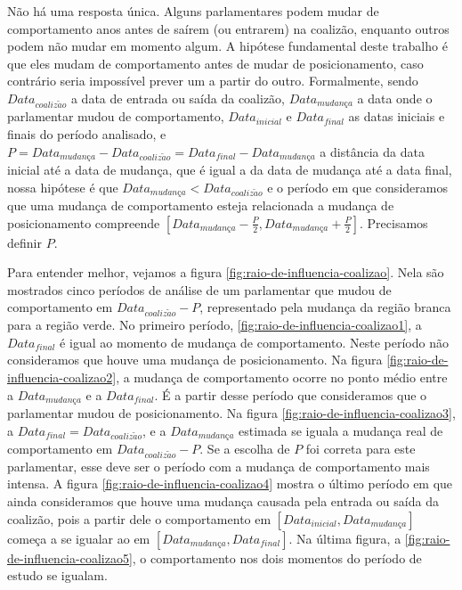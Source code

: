 \documentclass[a4paper,titlepage]{ppgi}\usepackage[]{graphicx}\usepackage[]{color}
\begin{document}
Não há uma resposta única. Alguns parlamentares podem mudar de comportamento
anos antes de saírem (ou entrarem) na coalizão, enquanto outros podem não mudar
em momento algum. A hipótese fundamental deste trabalho é que eles mudam de
comportamento antes de mudar de posicionamento, caso contrário seria impossível
prever um a partir do outro. Formalmente, sendo $Data_{coaliz\tilde{a}o}$ a
data de entrada ou saída da coalizão, $Data_{mudan\textit{\c{c}}a}$ a data onde
o parlamentar mudou de comportamento, $Data_{inicial}$ e $Data_{final}$ as datas
iniciais e finais do período analisado, e $P = Data_{mudan\textit{\c{c}}a} -
Data_{coaliz\tilde{a}o} = Data_{final} - Data_{mudan\textit{\c{c}}a}$ a
distância da data inicial até a data de mudança, que é igual a da data de
mudança até a data final, nossa hipótese é que $Data_{mudan\textit{\c{c}}a} <
Data_{coaliz\tilde{a}o}$ e o período em que consideramos que uma mudança de
comportamento esteja relacionada a mudança de posicionamento compreende
$\left[Data_{mudan\textit{\c{c}}a} - \frac{P}{2}, Data_{mudan\textit{\c{c}}a} +
\frac{P}{2}\right]$. Precisamos definir $P$.

Para entender melhor, vejamos a figura \ref{fig:raio-de-influencia-coalizao}.
Nela são mostrados cinco períodos de análise de um parlamentar que mudou de
comportamento em $Data_{coaliz\tilde{a}o} - P$, representado pela mudança da
região branca para a região verde. No primeiro período,
\ref{fig:raio-de-influencia-coalizao1}, a $Data_{final}$ é igual ao momento de
mudança de comportamento. Neste período não consideramos que houve uma mudança
de posicionamento. Na figura \ref{fig:raio-de-influencia-coalizao2}, a mudança
de comportamento ocorre no ponto médio entre a $Data_{mudan\textit{\c{c}}a}$ e
a $Data_{final}$.  É a partir desse período que consideramos que o parlamentar
mudou de posicionamento. Na figura \ref{fig:raio-de-influencia-coalizao3}, a
$Data_{final} = Data_{coaliz\tilde{a}o}$, e a $Data_{mudan\textit{\c{c}}a}$
estimada se iguala a mudança real de comportamento em $Data_{coaliz\tilde{a}o}
- P$. Se a escolha de $P$ foi correta para este parlamentar, esse deve ser o
período com a mudança de comportamento mais intensa. A figura
\ref{fig:raio-de-influencia-coalizao4} mostra o último período em que ainda
consideramos que houve uma mudança causada pela entrada ou saída da coalizão,
pois a partir dele o comportamento em $\left[Data_{inicial},
Data_{mudan\textit{\c{c}}a}\right]$ começa a se igualar ao em
$\left[Data_{mudan\textit{\c{c}}a}, Data_{final}\right]$. Na última figura, a
\ref{fig:raio-de-influencia-coalizao5}, o comportamento nos dois momentos do
período de estudo se igualam.
\end{document}
